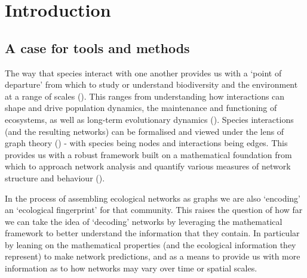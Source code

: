 \anglais
\doublespacing
\chapter*{Introduction}

\begin{refsection}
\section{A case for tools and methods}

The way that species interact with one another provides us with a `point of
departure' from which to study or understand biodiversity and the
environment at a range of scales (\cite{Jordano2016ChaEco}). This ranges from
understanding how interactions can shape and drive population dynamics,
the maintenance and functioning of ecosystems, as well as long-term
evolutionary dynamics (\cite{Landi2018Complexity, Albrecht2018Plant}).
Species interactions (and the resulting networks) can be formalised
and viewed under the lens of graph theory (\cite{Dale2010Graphs}) - with
species being nodes and interactions being edges. This provides us with
a robust framework built on a mathematical foundation from which to approach
network analysis and quantify various measures of network structure and
behaviour (\cite{Delmas2018Analysing}).

In the process of assembling ecological networks as graphs we are also
`encoding' an `ecological fingerprint' for that community. This raises
the question of how far we can take the idea of `decoding' networks
by leveraging the mathematical framework to better understand the
information that they contain. In particular by leaning on the
mathematical properties (and the ecological information they represent)
to make network predictions, and as a means to provide us with more
information as to how networks may vary over time or spatial scales.


\end{refsection}

